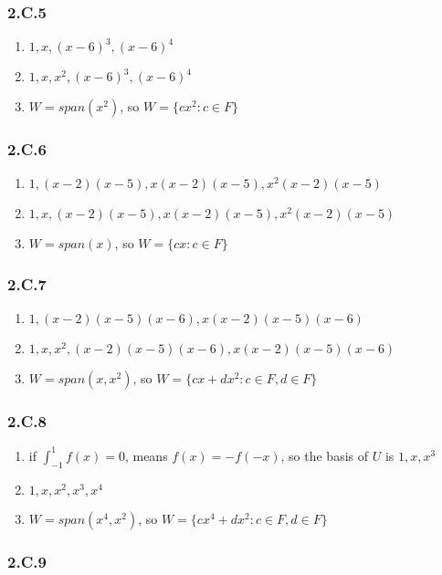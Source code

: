 \subsubsection*{2.C.5}
\begin{enumerate}[label=(\alph*)]
\item $1, x, (x-6)^{3}, (x-6)^{4}$
\item $1, x, x^{2}, (x-6)^{3}, (x-6)^{4}$
\item $W = span(x^{2})$, so $W=\{cx^{2}:c \in F\}$
\end{enumerate}

\subsubsection*{2.C.6}
\begin{enumerate}[label=(\alph*)]
\item $1, (x-2)(x-5), x(x-2)(x-5), x^{2}(x-2)(x-5)$
\item $1, x, (x-2)(x-5), x(x-2)(x-5), x^{2}(x-2)(x-5)$
\item $W = span(x)$, so $W=\{cx:c \in F\}$
\end{enumerate}

\subsubsection*{2.C.7}
\begin{enumerate}[label=(\alph*)]
\item $1, (x-2)(x-5)(x-6), x(x-2)(x-5)(x-6)$
\item $1, x, x^{2}, (x-2)(x-5)(x-6), x(x-2)(x-5)(x-6)$
\item $W = span(x, x^{2})$, so $W=\{cx+dx^{2}:c \in F, d \in F\}$
\end{enumerate}

\subsubsection*{2.C.8}
\begin{enumerate}[label=(\alph*)]
\item if $\int^{1}_{-1}f(x)=0$, means $f(x) = -f(-x)$, so the basis of $U$ is $1, x, x^{3}$
\item $1, x, x^{2}, x^{3}, x^{4}$
\item $W = span(x^{4}, x^{2})$, so $W=\{cx^{4}+dx^{2}:c \in F, d \in F\}$
\end{enumerate}

\subsubsection*{2.C.9}

